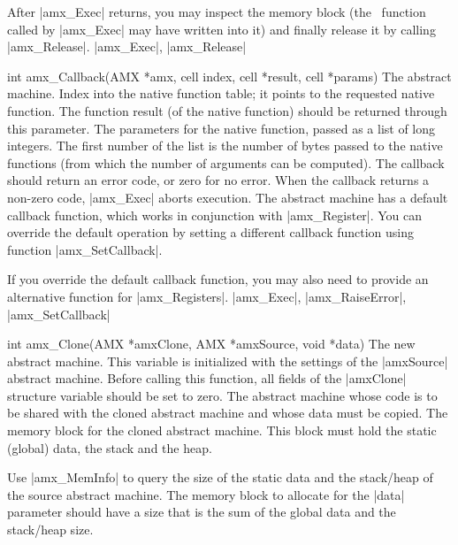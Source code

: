     After |amx_Exec| returns, you may inspect the memory block (the \Small\ function
    called by |amx_Exec| may have written into it) and finally release it by
    calling |amx_Release|.
\seealso |amx_Exec|, |amx_Release|

\syntaxp int amx_Callback(AMX *amx, cell index, cell *result, cell *params)
        The abstract machine.
        Index into the native function table; it points to the requested
        native function.
        The function result (of the native function) should be returned
        through this parameter.
        The parameters for the native function, passed as a list of long
        integers. The first number of the list is the number of bytes passed
        to the native functions (from which the number of arguments can be
        computed).
\returns
    The callback should return an error code, or zero for no error. When the
    callback returns a non-zero code, |amx_Exec| aborts execution.
\notes
    The abstract machine has a default callback function, which works in
    conjunction with |amx_Register|. You can override the default operation
    by setting a different callback function using function |amx_SetCallback|.

    If you override the default callback function, you may also need to
    provide an alternative function for |amx_Registers|.
\seealso |amx_Exec|, |amx_RaiseError|, |amx_SetCallback|

\syntaxp int amx_Clone(AMX *amxClone, AMX *amxSource, void *data)
        The new abstract machine. This variable is initialized with the settings
        of the |amxSource| abstract machine. Before calling this function, all
        fields of the |amxClone| structure variable should be set to zero.
        The abstract machine whose code is to be shared with the cloned
        abstract machine and whose data must be copied.
        The memory block for the cloned abstract machine. This block must
        hold the static (global) data, the stack and the heap.

\notes
    Use |amx_MemInfo| to query the size of the static data and the stack\slash heap
    of the source abstract machine. The memory block to allocate for the |data|
    parameter should have a size that is the sum of the global data and the
    stack\slash heap size.

